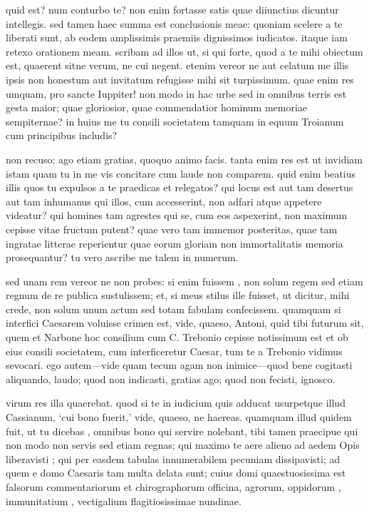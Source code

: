  quid est? num conturbo te? non enim fortasse satis quae diiunctius dicuntur intellegis. sed tamen haec summa est conclusionis meae: quoniam scelere a te liberati sunt, ab eodem amplissimis praemiis dignissimos iudicatos. itaque iam retexo orationem meam. scribam ad illos ut, si qui forte, quod a te mihi obiectum est, quaerent sitne verum, ne cui negent. etenim vereor ne aut celatum me illis ipsis non honestum aut invitatum refugisse mihi sit turpissimum. quae enim res umquam, pro sancte Iuppiter! non modo in hac urbe sed in omnibus terris est gesta maior; quae gloriosior, quae commendatior hominum memoriae sempiternae? in huius me tu consili societatem tamquam in equum Troianum cum principibus includis?

 non recuso; ago etiam gratias, quoquo animo facis. tanta enim res est ut invidiam istam quam tu in me vis concitare cum laude non comparem. quid enim beatius illis quos tu expulsos a te praedicas et relegatos? qui locus est aut tam desertus aut tam inhumanus qui illos, cum accesserint, non adfari atque appetere videatur? qui homines tam agrestes qui se, cum eos aspexerint, non maximum cepisse vitae fructum putent? quae vero tam immemor posteritas, quae tam ingratae litterae reperientur quae eorum gloriam non immortalitatis memoria prosequantur? tu vero ascribe me talem in numerum.

 sed unam rem vereor ne non probes: si enim fuissem , non solum regem sed etiam regnum de re publica sustulissem; et, si meus stilus ille fuisset, ut dicitur, mihi crede, non solum unum actum sed totam fabulam confecissem. quamquam si interfici Caesarem voluisse crimen est, vide, quaeso, Antoni, quid tibi futurum sit, quem et Narbone hoc consilium cum C. Trebonio cepisse notissimum est et ob eius consili societatem, cum interficeretur Caesar, tum te a Trebonio vidimus sevocari. ego autem—vide quam tecum agam non inimice—quod bene cogitasti aliquando, laudo; quod non indicasti, gratias ago; quod non fecisti, ignosco.

 virum res illa quaerebat. quod si te in iudicium quis adducat usurpetque illud Cassianum, `cui bono fuerit,' vide, quaeso, ne haereas. quamquam illud quidem fuit, ut tu dicebas , omnibus bono qui servire nolebant, tibi tamen praecipue qui non modo non servis sed etiam regnas; qui maximo te aere alieno ad aedem Opis liberavisti ; qui per easdem tabulas innumerabilem pecuniam dissipavisti; ad quem e domo Caesaris tam multa delata sunt; cuius domi quaestuosissima est falsorum commentariorum et chirographorum officina, agrorum, oppidorum , immunitatium , vectigalium flagitiosissimae nundinae.


